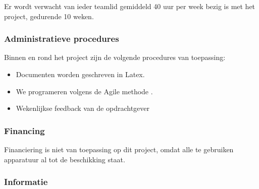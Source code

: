 Er wordt verwacht van ieder teamlid gemiddeld 40 uur per week bezig is met het project, gedurende 10 weken.

\subsubsection{Administratieve procedures}

Binnen en rond het project zijn de volgende procedures van toepassing:

\begin{itemize}
    \item Documenten worden geschreven in Latex.
    \item We programeren volgens de Agile methode \cite{wiki:agile}.
    \item Wekenlijkse feedback van de opdrachtgever
\end{itemize}

\subsubsection{Financing}

Financiering is niet van toepassing op dit project, omdat alle te gebruiken apparatuur al tot de beschikking staat.

\subsubsection{Informatie}





